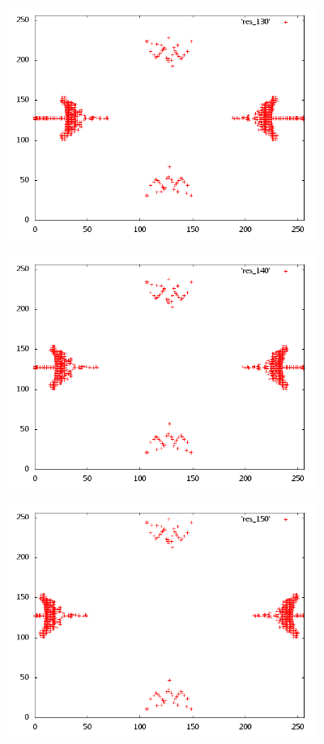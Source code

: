 \begin{center}
\includegraphics[width=4in]{res_130.png}
\end{center}
\begin{center}
\includegraphics[width=4in]{res_140.png}
\end{center}
\begin{center}
\includegraphics[width=4in]{res_150.png}
\end{center}
